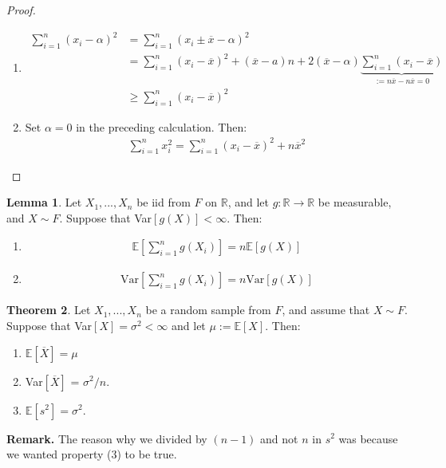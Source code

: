 \documentclass[11pt]{scrartcl}
\newcommand{\R}[0]{\mathbb{R}}
\theoremstyle{definition}
\newtheorem{theorem}{Theorem}
\newtheorem{lemma}[theorem]{Lemma}
\theoremstyle{remark}
\newcommand{\EX}[1]{\mathbb{E}\left[#1 \right]}
\begin{document}
{\begin{proof}
	\begin{enumerate}[noitemsep]
		\item 
			\begin{align*}
				\sum_{i=1}^n (x_i - \alpha)^2 & = \sum_{i=1}^n (x_i \pm \overline{x} - \alpha)^2 \\
					& = \sum_{i=1}^n (x_i - \overline{x})^2 + (\overline{x} - a)n + 2(\overline{x}-\alpha) \underbrace{\sum_{i=1}^n (x_i - \overline{x})}_{:= n\overline{x} - n \overline{x} = 0} \\
					& \geq \sum_{i=1}^n (x_i - \overline{x})^2
			\end{align*}	
		\item Set $\alpha=0$ in the preceding calculation. Then: 
		\begin{align*}
			\sum_{i=1}^n x_i^2 = \sum_{i=1}^n (x_i - \overline{x})^2 + n\overline{x}^2	
		\end{align*}
	\end{enumerate}
\end{proof}

\begin{lemma}
	Let $X_1, ..., X_n$ be iid from $F$ on $\R$, and let $g: \R \rightarrow \R$ be measurable, and $X \sim F$. Suppose that Var$[g(X)] < \infty$. Then: 
	\begin{enumerate}[noitemsep]
		\item 
		\begin{align}
			\mathbb{E} \left[ 	\sum_{i=1}^n g(X_i)		\right]  = n \mathbb{E} [ g(X) ] 
		\end{align}
		\item 
		\begin{align}
			\text{Var} \left[ 	\sum_{i=1}^n g(X_i ) 	\right] =  n \text{Var}[g(X)] 
		\end{align}
	\end{enumerate}
\end{lemma}

\begin{theorem}
	Let $X_1, ..., X_n$ be a random sample from $F$, and assume that $X \sim F$. Suppose that Var$[X] = \sigma^2 < \infty$ and let $\mu := \EX{X}$. Then: 
	\begin{enumerate}[noitemsep]
		\item $\EX{\overline{X}} = \mu$
		\item Var$[\overline{X}]$ = $\sigma^2 / n$. 
		\item $\EX{s^2} = \sigma^2$. 
	\end{enumerate}
\end{theorem}
\textbf{Remark.} The reason why we divided by $(n-1)$ and not $n$ in $s^2$ was because we wanted property (3) to be true. 

}
\end{document}
